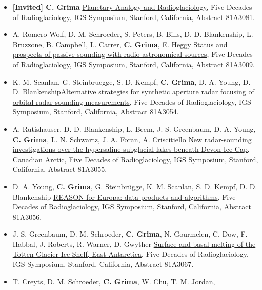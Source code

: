 \begin{itemize}
\item
  \textbf{{[}Invited{]} C. Grima}
  \href{https://www.igsoc.org/symposia/2019/stanford/proceedings/procsfiles/procabstracts_75.html\#A3081}{Planetary
  Analogy and Radioglaciology}, Five Decades of Radioglaciology, IGS
  Symposium, Stanford, California, Abstract 81A3081.
\item
  A. Romero-Wolf, D. M. Schroeder, S. Peters, B. Bills, D. D.
  Blankenship, L. Bruzzone, B. Campbell, L. Carrer, \textbf{C. Grima},
  E. Heggy
  \href{https://www.igsoc.org/symposia/2019/stanford/proceedings/procsfiles/procabstracts_75.html\#A3009}{Status
  and prospects of passive sounding with radio-astronomical sources},
  Five Decades of Radioglaciology, IGS Symposium, Stanford, California,
  Abstract 81A3009.
\item
  K. M. Scanlan, G. Steinbruegge, S. D. Kempf, \textbf{C. Grima}, D. A.
  Young, D. D.
  Blankenship\href{https://www.igsoc.org/symposia/2019/stanford/proceedings/procsfiles/procabstracts_75.html\#A3054}{Alternative
  strategies for synthetic aperture radar focusing of orbital radar
  sounding measurements}, Five Decades of Radioglaciology, IGS
  Symposium, Stanford, California, Abstract 81A3054.
\item
  A. Rutishauser, D. D. Blankenship, L. Beem, J. S. Greenbaum, D. A.
  Young, \textbf{C. Grima}, L. N. Schwartz, J. A. Foran, A. Criscitiello
  \href{https://www.igsoc.org/symposia/2019/stanford/proceedings/programmepure.html\#Prog3055}{New
  radar-sounding investigations over the hypersaline subglacial lakes
  beneath Devon Ice Cap, Canadian Arctic}, Five Decades of
  Radioglaciology, IGS Symposium, Stanford, California, Abstract
  81A3055.
\item
  D. A. Young, \textbf{C. Grima}, G. Steinbrügge, K. M. Scanlan, S. D.
  Kempf, D. D. Blankenship
  \href{https://www.igsoc.org/symposia/2019/stanford/proceedings/programmepure.html\#Prog3056}{REASON
  for Europa: data products and algorithms}, Five Decades of
  Radioglaciology, IGS Symposium, Stanford, California, Abstract
  81A3056.
\item
  J. S. Greenbaum, D. M. Schroeder, \textbf{C. Grima}, N. Gourmelen, C.
  Dow, F. Habbal, J. Roberts, R. Warner, D. Gwyther
  \href{https://www.igsoc.org/symposia/2019/stanford/proceedings/programmepure.html\#Prog3067}{Surface
  and basal melting of the Totten Glacier Ice Shelf, East Antarctica},
  Five Decades of Radioglaciology, IGS Symposium, Stanford, California,
  Abstract 81A3067.
\item
  T. Creyts, D. M. Schroeder, \textbf{C. Grima}, W. Chu, T. M. Jordan,

\end{itemize}
